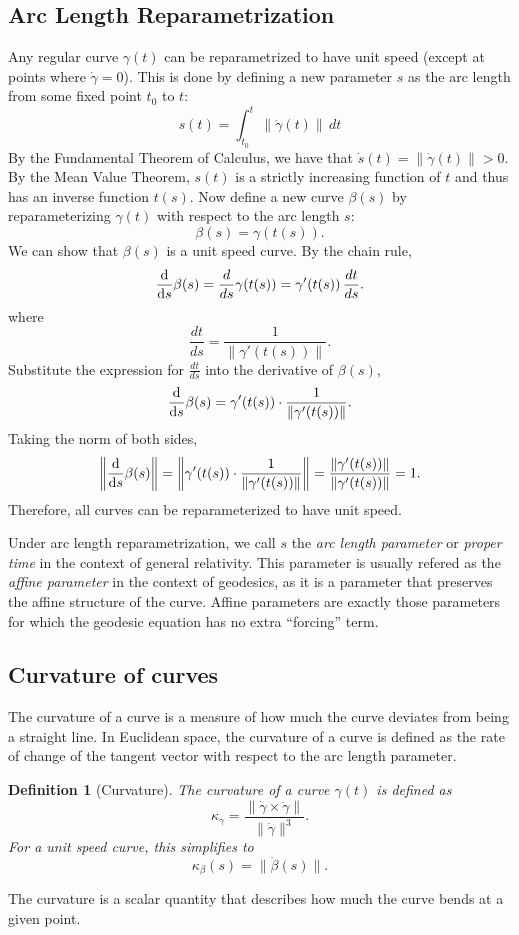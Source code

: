 \documentclass[12pt]{article}
\newtheorem{definition}{Definition}[section]
\begin{document}
\subsection{Arc Length Reparametrization}
Any regular curve $\gamma(t)$ can be reparametrized to have unit speed (except at points where $\dot\gamma=0$). 
This is done by defining a new parameter $s$ as the arc length from some fixed point $t_0$ to $t$:
\[
s(t) = \int_{t_0}^{t} \|\dot\gamma(t)\|\,dt 
\]
By the Fundamental Theorem of Calculus, we have that $\dot{s}(t) = \|\dot\gamma(t)\| > 0$.
By the Mean Value Theorem, $s(t)$ is a strictly increasing function of $t$ and thus has an inverse function $t(s)$.
Now define a new curve \(\beta(s)\) by reparameterizing \(\gamma(t)\) with respect to the arc length \(s\):
\[
\beta(s)=\gamma(t(s)).
\]
We can show that \(\beta(s)\) is a unit speed curve.
By the chain rule,
\[
\dv{s}\beta(s) = \frac{d}{ds}\gamma(t(s)) = \gamma'(t(s))\,\frac{dt}{ds}.
\]
where 
\[
\frac{dt}{ds} = \frac{1}{\|\gamma'(t(s))\|}.
\]
Substitute the expression for \(\frac{dt}{ds}\) into the derivative of \(\beta(s)\),
\[
\dv{s}\beta(s) = \gamma'(t(s))\cdot \frac{1}{\|\gamma'(t(s))\|}.
\]
Taking the norm of both sides,
\[
\left\|\dv{s}\beta(s)\right\| = \left\|\gamma'(t(s)) \cdot \frac{1}{\|\gamma'(t(s))\|}\right\| = \frac{\|\gamma'(t(s))\|}{\|\gamma'(t(s))\|} = 1.
\]
Therefore, all curves can be reparameterized to have unit speed.

Under arc length reparametrization, we call $s$ the \emph{arc length parameter} or \emph{proper time} in the context of general relativity.
This parameter is usually refered as the \emph{affine parameter} in the context of geodesics, as it is a parameter that preserves the affine structure of the curve.
Affine parameters are exactly those parameters for which the geodesic equation has no extra “forcing” term.

\subsection{Curvature of curves}
The curvature of a curve is a measure of how much the curve deviates from being a straight line.
In Euclidean space, the curvature of a curve is defined as the rate of change of the tangent vector with respect to the arc length parameter.

\begin{definition}[Curvature]\label{def:curvature}
	The curvature of a curve $\gamma(t)$ is defined as
	\[
	\kappa_{\gamma} = \frac{\|\dot{\gamma}\times\ddot{\gamma}\|}{\|\dot{\gamma}\|^{3}}.
	\]
	For a unit speed curve, this simplifies to
	\[
	\kappa_{\beta}(s) = \|\ddot{\beta}(s)\|.
	\]
\end{definition}
The curvature is a scalar quantity that describes how much the curve bends at a given point.
\end{document}
